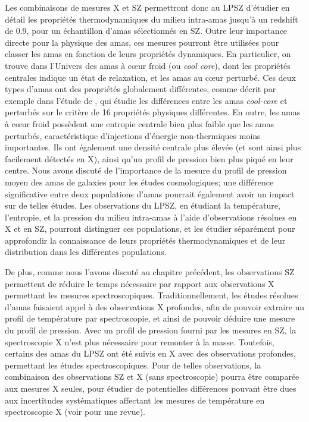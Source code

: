 Les combinaisons de mesures X et SZ permettront donc au LPSZ d'étudier en détail les propriétés thermodynamiques du milieu intra-amas jusqu'à un redshift de $0.9$, pour un échantillon d'amas sélectionnés en SZ.
Outre leur importance directe pour la physique des amas, ces mesures pourront être utilisées pour classer les amas en fonction de leurs propriétés dynamiques.
En particulier, on trouve dans l'Univers des amas à cœur froid (ou \textit{cool core}), dont les propriétés centrales indique un état de relaxation, et les amas au cœur perturbé.
Ces deux types d'amas ont des propriétés globalement différentes, comme décrit par exemple dans l'étude de , qui étudie les différences entre les amas \textit{cool-core} et perturbés sur le critère de 16 propriétés physiques différentes.
En outre, les amas à cœur froid possèdent une entropie centrale bien plus faible que les amas perturbés, caractéristique d'injections d'énergie non-thermiques moins importantes.
Ils ont également une densité centrale plus élevée (et sont ainsi plus facilement détectés en X), ainsi qu'un profil de pression bien plus piqué en leur centre.
Nous avons discuté de l'importance de la mesure du profil de pression moyen des amas de galaxies pour les études cosmologiques; une différence significative entre deux populations d'amas pourrait également avoir un impact sur de telles études.
Les observations du LPSZ, en étudiant la température, l'entropie, et la pression du milieu intra-amas à l'aide d'observations résolues en X et en SZ, pourront distinguer ces populations, et les étudier séparément pour approfondir la connaissance de leurs propriétés thermodynamiques et de leur distribution dans les différentes populations.

De plus, comme nous l'avons discuté au chapitre précédent, les observations SZ permettent de réduire le temps nécessaire par rapport aux observations X permettant les mesures spectroscopiques.
Traditionnellement, les études résolues d'amas faisaient appel à des observations X profondes, afin de pouvoir extraire un profil de température par spectroscopie, et ainsi de pouvoir déduire une mesure du profil de pression.
Avec un profil de pression fourni par les mesures en SZ, la spectroscopie X n'est plus nécessaire pour remonter à la masse.
Toutefois, certains des amas du LPSZ ont été suivis en X avec des observations profondes, permettant les études spectroscopiques.
Pour de telles observations, la combinaison des observations SZ et X (sans spectroscopie) pourra être comparée aux mesures X seules, pour étudier de potentielles différences pouvant être dues aux incertitudes systématiques affectant les mesures de température en spectroscopie X (voir \cite{bohringer_x-ray_2010} pour une revue).

